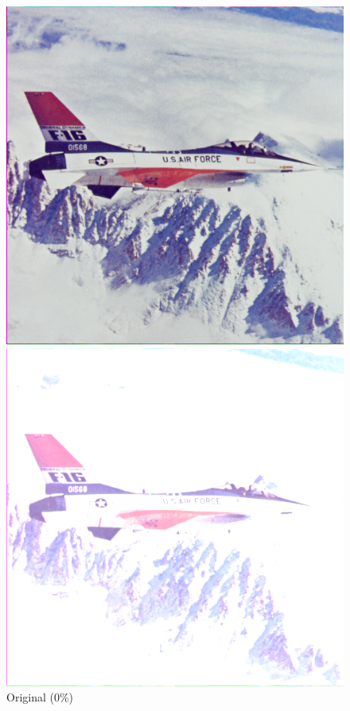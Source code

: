 \documentclass[a4paper, 11pt, portuguese]{article}
\begin{document}
\begin{figure}[htbp]
\centering
\begin{minipage}{0.32\textwidth}
    \centering
    \includegraphics[width=\textwidth]{imagens/airplane.png}
    \caption*{Original (0\%)}
\end{minipage}
\hfill
\begin{minipage}{0.32\textwidth}
    \centering
    \includegraphics[width=\textwidth]{imagens/airplane_brighter_50.png}

\end{minipage}
\end{figure}
\end{document}
